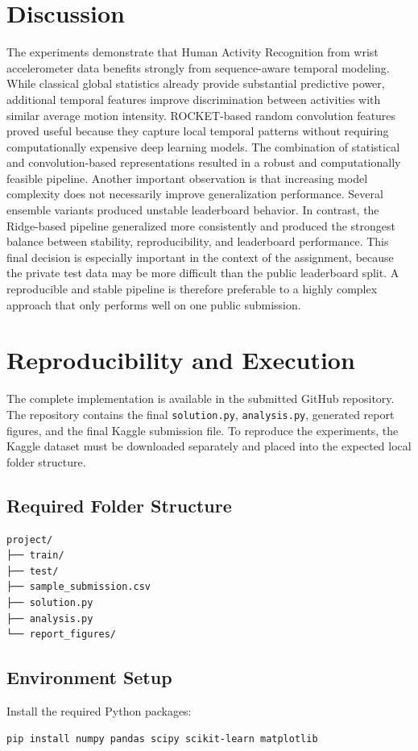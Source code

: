 \documentclass[conference]{IEEEtran}
\begin{document}
\section{Discussion}
The experiments demonstrate that Human Activity Recognition from wrist accelerometer data benefits strongly from sequence-aware temporal modeling. While classical global statistics already provide substantial predictive power, additional temporal features improve discrimination between activities with similar average motion intensity.
ROCKET-based random convolution features proved useful because they capture local temporal patterns without requiring computationally expensive deep learning models. The combination of statistical and convolution-based representations resulted in a robust and computationally feasible pipeline.
Another important observation is that increasing model complexity does not necessarily improve generalization performance. Several ensemble variants produced unstable leaderboard behavior. In contrast, the Ridge-based pipeline generalized more consistently and produced the strongest balance between stability, reproducibility, and leaderboard performance.
This final decision is especially important in the context of the assignment, because the private test data may be more difficult than the public leaderboard split. A reproducible and stable pipeline is therefore preferable to a highly complex approach that only performs well on one public submission.
\section{Reproducibility and Execution}
The complete implementation is available in the submitted GitHub repository. The repository contains the final \texttt{solution.py}, \texttt{analysis.py}, generated report figures, and the final Kaggle submission file. To reproduce the experiments, the Kaggle dataset must be downloaded separately and placed into the expected local folder structure.
\subsection{Required Folder Structure}
\begin{verbatim}
project/
├── train/
├── test/
├── sample_submission.csv
├── solution.py
├── analysis.py
└── report_figures/
\end{verbatim}
\subsection{Environment Setup}
Install the required Python packages:
\begin{verbatim}
pip install numpy pandas scipy scikit-learn matplotlib
\end{verbatim}
\end{document}
